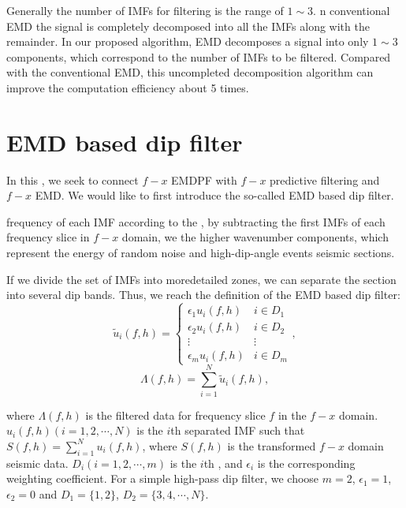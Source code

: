 Generally the number of IMFs for filtering is  the range of $1\sim3$. n conventional EMD\wen{,} the signal is completely decomposed into all the IMFs\wen{,} along with the remainder. In our proposed algorithm, EMD decomposes a signal into only $1\sim3$ components, which correspond to the number of IMFs to be filtered. Compared with the conventional EMD, this uncompleted decomposition algorithm can improve the computation efficiency  about 5 times.

\section{EMD based dip filter}
In this , we seek to connect $f-x$ EMDPF with $f-x$ predictive filtering and $f-x$ EMD. We would like to first introduce the so-called EMD based dip filter. 


 frequency of each IMF  according to the , by subtracting the first  IMFs of each frequency slice in  $f-x$ domain, we  the higher wavenumber components, which represent the energy of random noise and high-dip-angle events  seismic sections. 

If we divide the set of IMFs into more\wen{-}detailed zones, we can separate the section into several dip bands. Thus, we reach the definition of the EMD based dip filter:
\begin{equation}
\label{eq:dip}
\tilde{u}_i(f,h)=\left\{\begin{array}{ll}
\epsilon_1u_i(f,h)   &   i\in D_1\\
\epsilon_2u_i(f,h)   &   i\in D_2\\
\vdots	           &   \vdots  \\
\epsilon_mu_i(f,h)   &   i\in D_m
\end{array}\right.,
\end{equation}
\begin{equation}
\label{eq:dip1}
\Lambda(f,h)=\sum_{i=1}^{N}\tilde{u}_i(f,h),
\end{equation}

where $\Lambda(f,h)$ is the filtered data for frequency slice $f$ in the $f-x$ domain. $u_i(f,h)(i=1,2,\cdots,N)$ is the $i$th separated IMF such that $S(f,h)=\sum_{i=1}^{N}u_i(f,h)$, where $S(f,h)$ is the transformed $f-x$ domain seismic data. $D_i(i=1,2,\cdots,m)$ is the $i$th , and $\epsilon_i$ is the corresponding weighting coefficient. For a simple high-pass dip filter, we choose $m=2$, $\epsilon_1=1$, $\epsilon_2=0$ and $D_1=\{1,2\}$, $D_2=\{3,4,\cdots,N\}$.

